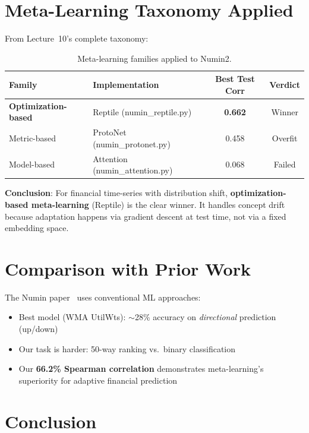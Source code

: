\documentclass[11pt,a4paper]{article}
\begin{document}
\section{Meta-Learning Taxonomy Applied}

From Lecture~10's complete taxonomy:

\begin{table}[H]
\centering
\caption{Meta-learning families applied to Numin2.}
\begin{tabular}{llcc}
\toprule
\textbf{Family} & \textbf{Implementation} & \textbf{Best Test Corr} & \textbf{Verdict} \\
\midrule
\textbf{Optimization-based} & Reptile (numin\_reptile.py) & \textbf{0.662} & Winner \\
Metric-based & ProtoNet (numin\_protonet.py) & 0.458 & Overfit \\
Model-based & Attention (numin\_attention.py) & 0.068 & Failed \\
\bottomrule
\end{tabular}
\end{table}

\textbf{Conclusion}: For financial time-series with distribution shift, \textbf{optimization-based meta-learning} (Reptile) is the clear winner. It handles concept drift because adaptation happens via gradient descent at test time, not via a fixed embedding space.

\section{Comparison with Prior Work}

The Numin paper~\cite{numin2024} uses conventional ML approaches:
\begin{itemize}[nosep]
    \item Best model (WMA UtilWts): $\sim$28\% accuracy on \emph{directional} prediction (up/down)
    \item Our task is harder: 50-way ranking vs.\ binary classification
    \item Our \textbf{66.2\% Spearman correlation} demonstrates meta-learning's superiority for adaptive financial prediction
\end{itemize}

\section{Conclusion}
\end{document}
